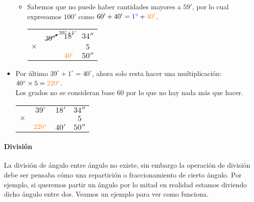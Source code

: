 \begin{example}
\begin{itemize}
\begin{itemize}
			\item  Sabemos que no puede haber cantidades mayores a $59'$, por lo cual 
			expresamos $100'$ como  $60' + 40' = \textcolor{blue}{1^\circ} + 
			\textcolor{orange}{40'}$.

			\begin{center}
				\begin{tabular}{ c c c c}
						& $\cancelto{39^\circ + \textcolor{blue}{1^\circ}}{39^\circ}$ &
						$18'$ & 
						$34''$ \\
					$\times$ &   &  & $5$ \\
					\hline
					&  & 
					$\textcolor{orange}{40'}$  &  
					$50''$
				\end{tabular}
			\end{center}
		\end{itemize}

		\item Por último $39^\circ + 1^\circ = 40^\circ$, ahora solo resta hacer una 
		multiplicación: $40^\circ \times 5 = \textcolor{orange}{220^\circ}$.\\
		Los grados no se consideran base 60 por lo que no hay nada más que hacer.
		\begin{center}
			\begin{tabular}{ c c c c}
					& $39^\circ$ &
					$18'$ & 
					$34''$ \\
				$\times$ &   &  & $5$ \\
				\hline
				& $\textcolor{orange}{220^\circ}$ & 
				$40'$  &  
				$50''$
			\end{tabular}	
		\end{center}	
	\end{itemize}
\end{example}

\paragraph{División}
La división de ángulo entre ángulo no existe, sin embargo la operación de 
división debe ser pensaba cómo una repartición o fraccionamiento de cierto
ángulo. Por ejemplo, si queremos partir un ángulo por lo mitad en realidad 
estamos diviendo dicho ángulo entre dos.
Veamos un ejemplo para ver como funciona.

